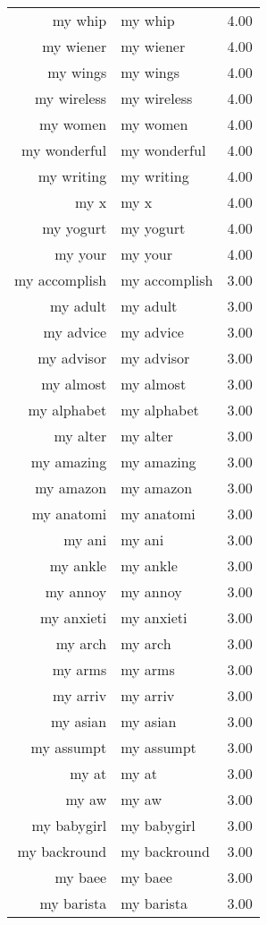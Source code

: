 \begin{table}[ht]
\begin{tabular}{rlr}
  my whip & my whip & 4.00 \\ 
  my wiener & my wiener & 4.00 \\ 
  my wings & my wings & 4.00 \\ 
  my wireless & my wireless & 4.00 \\ 
  my women & my women & 4.00 \\ 
  my wonderful & my wonderful & 4.00 \\ 
  my writing & my writing & 4.00 \\ 
  my x & my x & 4.00 \\ 
  my yogurt & my yogurt & 4.00 \\ 
  my your & my your & 4.00 \\ 
  my accomplish & my accomplish & 3.00 \\ 
  my adult & my adult & 3.00 \\ 
  my advice & my advice & 3.00 \\ 
  my advisor & my advisor & 3.00 \\ 
  my almost & my almost & 3.00 \\ 
  my alphabet & my alphabet & 3.00 \\ 
  my alter & my alter & 3.00 \\ 
  my amazing & my amazing & 3.00 \\ 
  my amazon & my amazon & 3.00 \\ 
  my anatomi & my anatomi & 3.00 \\ 
  my ani & my ani & 3.00 \\ 
  my ankle & my ankle & 3.00 \\ 
  my annoy & my annoy & 3.00 \\ 
  my anxieti & my anxieti & 3.00 \\ 
  my arch & my arch & 3.00 \\ 
  my arms & my arms & 3.00 \\ 
  my arriv & my arriv & 3.00 \\ 
  my asian & my asian & 3.00 \\ 
  my assumpt & my assumpt & 3.00 \\ 
  my at & my at & 3.00 \\ 
  my aw & my aw & 3.00 \\ 
  my babygirl & my babygirl & 3.00 \\ 
  my backround & my backround & 3.00 \\ 
  my baee & my baee & 3.00 \\ 
  my barista & my barista & 3.00 \\ 

\end{tabular}
\end{table}
